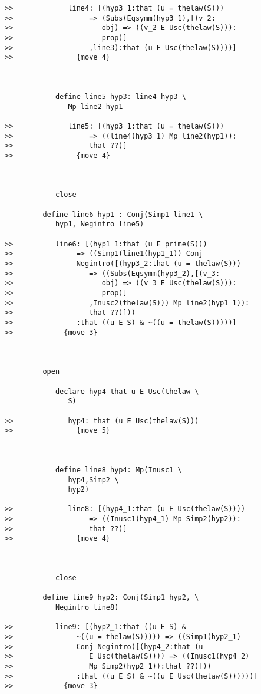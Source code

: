 \documentclass[12pt]{article}
\begin{document}
\begin{verbatim}
>>             line4: [(hyp3_1:that (u = thelaw(S)))
>>                  => (Subs(Eqsymm(hyp3_1),[(v_2:
>>                     obj) => ((v_2 E Usc(thelaw(S))):
>>                     prop)]
>>                  ,line3):that (u E Usc(thelaw(S))))]
>>               {move 4}



            define line5 hyp3: line4 hyp3 \
               Mp line2 hyp1

>>             line5: [(hyp3_1:that (u = thelaw(S)))
>>                  => ((line4(hyp3_1) Mp line2(hyp1)):
>>                  that ??)]
>>               {move 4}



            close

         define line6 hyp1 : Conj(Simp1 line1 \
            hyp1, Negintro line5)

>>          line6: [(hyp1_1:that (u E prime(S)))
>>               => ((Simp1(line1(hyp1_1)) Conj
>>               Negintro([(hyp3_2:that (u = thelaw(S)))
>>                  => ((Subs(Eqsymm(hyp3_2),[(v_3:
>>                     obj) => ((v_3 E Usc(thelaw(S))):
>>                     prop)]
>>                  ,Inusc2(thelaw(S))) Mp line2(hyp1_1)):
>>                  that ??)]))
>>               :that ((u E S) & ~((u = thelaw(S)))))]
>>            {move 3}



         open

            declare hyp4 that u E Usc(thelaw \
               S)

>>             hyp4: that (u E Usc(thelaw(S)))
>>               {move 5}



            define line8 hyp4: Mp(Inusc1 \
               hyp4,Simp2 \
               hyp2)

>>             line8: [(hyp4_1:that (u E Usc(thelaw(S))))
>>                  => ((Inusc1(hyp4_1) Mp Simp2(hyp2)):
>>                  that ??)]
>>               {move 4}



            close

         define line9 hyp2: Conj(Simp1 hyp2, \
            Negintro line8)

>>          line9: [(hyp2_1:that ((u E S) &
>>               ~((u = thelaw(S))))) => ((Simp1(hyp2_1)
>>               Conj Negintro([(hyp4_2:that (u
>>                  E Usc(thelaw(S)))) => ((Inusc1(hyp4_2)
>>                  Mp Simp2(hyp2_1)):that ??)]))
>>               :that ((u E S) & ~((u E Usc(thelaw(S))))))]
>>            {move 3}




\end{verbatim}
\end{document}
